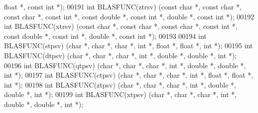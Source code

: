 \begin{DoxyCode}
{      float}  *, \textcolor{keyword}{const} \textcolor{keywordtype}{int} *);
00191 \textcolor{keywordtype}{int} BLASFUNC(ztrsv) (\textcolor{keyword}{const} \textcolor{keywordtype}{char} *, \textcolor{keyword}{const} \textcolor{keywordtype}{char} *, \textcolor{keyword}{const} \textcolor{keywordtype}{char} *, \textcolor{keyword}{const} \textcolor{keywordtype}{int} *, \textcolor{keyword}{const} \textcolor{keywordtype}{double} *, \textcolor{keyword}{const} \textcolor{keywordtype}{int} *, \textcolor{keywordtype}{
      double} *, \textcolor{keyword}{const} \textcolor{keywordtype}{int} *);
00192 \textcolor{keywordtype}{int} BLASFUNC(xtrsv) (\textcolor{keyword}{const} \textcolor{keywordtype}{char} *, \textcolor{keyword}{const} \textcolor{keywordtype}{char} *, \textcolor{keyword}{const} \textcolor{keywordtype}{char} *, \textcolor{keyword}{const} \textcolor{keywordtype}{int} *, \textcolor{keyword}{const} \textcolor{keywordtype}{double} *, \textcolor{keyword}{const} \textcolor{keywordtype}{int} *, \textcolor{keywordtype}{
      double} *, \textcolor{keyword}{const} \textcolor{keywordtype}{int} *);
00193 
00194 \textcolor{keywordtype}{int} BLASFUNC(stpsv) (\textcolor{keywordtype}{char} *, \textcolor{keywordtype}{char} *, \textcolor{keywordtype}{char} *, \textcolor{keywordtype}{int} *, \textcolor{keywordtype}{float}  *, \textcolor{keywordtype}{float}  *, \textcolor{keywordtype}{int} *);
00195 \textcolor{keywordtype}{int} BLASFUNC(dtpsv) (\textcolor{keywordtype}{char} *, \textcolor{keywordtype}{char} *, \textcolor{keywordtype}{char} *, \textcolor{keywordtype}{int} *, \textcolor{keywordtype}{double} *, \textcolor{keywordtype}{double} *, \textcolor{keywordtype}{int} *);
00196 \textcolor{keywordtype}{int} BLASFUNC(qtpsv) (\textcolor{keywordtype}{char} *, \textcolor{keywordtype}{char} *, \textcolor{keywordtype}{char} *, \textcolor{keywordtype}{int} *, \textcolor{keywordtype}{double} *, \textcolor{keywordtype}{double} *, \textcolor{keywordtype}{int} *);
00197 \textcolor{keywordtype}{int} BLASFUNC(ctpsv) (\textcolor{keywordtype}{char} *, \textcolor{keywordtype}{char} *, \textcolor{keywordtype}{char} *, \textcolor{keywordtype}{int} *, \textcolor{keywordtype}{float}  *, \textcolor{keywordtype}{float}  *, \textcolor{keywordtype}{int} *);
00198 \textcolor{keywordtype}{int} BLASFUNC(ztpsv) (\textcolor{keywordtype}{char} *, \textcolor{keywordtype}{char} *, \textcolor{keywordtype}{char} *, \textcolor{keywordtype}{int} *, \textcolor{keywordtype}{double} *, \textcolor{keywordtype}{double} *, \textcolor{keywordtype}{int} *);
00199 \textcolor{keywordtype}{int} BLASFUNC(xtpsv) (\textcolor{keywordtype}{char} *, \textcolor{keywordtype}{char} *, \textcolor{keywordtype}{char} *, \textcolor{keywordtype}{int} *, \textcolor{keywordtype}{double} *, \textcolor{keywordtype}{double} *, \textcolor{keywordtype}{int} *);

\end{DoxyCode}
